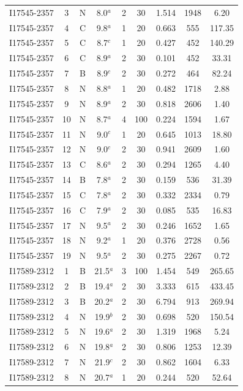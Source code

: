 \begin{table}
\begin{tabular}{ccccccccc}
I17545-2357 & 3 & N & 8.0$^{a}$ & 2 & 30 & 1.514 & 1948 & 6.20 \\
I17545-2357 & 4 & C & 9.8$^{a}$ & 1 & 20 & 0.663 & 555 & 117.35 \\
I17545-2357 & 5 & C & 8.7$^{c}$ & 1 & 20 & 0.427 & 452 & 140.29 \\
I17545-2357 & 6 & C & 8.9$^{a}$ & 2 & 30 & 0.101 & 452 & 33.31 \\
I17545-2357 & 7 & B & 8.9$^{c}$ & 2 & 30 & 0.272 & 464 & 82.24 \\
I17545-2357 & 8 & N & 8.8$^{a}$ & 1 & 20 & 0.482 & 1718 & 2.88 \\
I17545-2357 & 9 & N & 8.9$^{a}$ & 2 & 30 & 0.818 & 2606 & 1.40 \\
I17545-2357 & 10 & N & 8.7$^{a}$ & 4 & 100 & 0.224 & 1594 & 1.67 \\
I17545-2357 & 11 & N & 9.0$^{c}$ & 1 & 20 & 0.645 & 1013 & 18.80 \\
I17545-2357 & 12 & N & 9.0$^{c}$ & 2 & 30 & 0.941 & 2609 & 1.60 \\
I17545-2357 & 13 & C & 8.6$^{a}$ & 2 & 30 & 0.294 & 1265 & 4.40 \\
I17545-2357 & 14 & B & 7.8$^{a}$ & 2 & 30 & 0.159 & 536 & 31.39 \\
I17545-2357 & 15 & C & 7.8$^{a}$ & 2 & 30 & 0.332 & 2334 & 0.79 \\
I17545-2357 & 16 & C & 7.9$^{a}$ & 2 & 30 & 0.085 & 535 & 16.83 \\
I17545-2357 & 17 & N & 9.5$^{a}$ & 2 & 30 & 0.246 & 1652 & 1.65 \\
I17545-2357 & 18 & N & 9.2$^{a}$ & 1 & 20 & 0.376 & 2728 & 0.56 \\
I17545-2357 & 19 & N & 9.5$^{a}$ & 2 & 30 & 0.275 & 2267 & 0.72 \\
I17589-2312 & 1 & B & 21.5$^{a}$ & 3 & 100 & 1.454 & 549 & 265.65 \\
I17589-2312 & 2 & B & 19.4$^{a}$ & 2 & 30 & 3.333 & 615 & 433.45 \\
I17589-2312 & 3 & B & 20.2$^{a}$ & 2 & 30 & 6.794 & 913 & 269.94 \\
I17589-2312 & 4 & N & 19.9$^{b}$ & 2 & 30 & 0.698 & 520 & 150.54 \\
I17589-2312 & 5 & N & 19.6$^{a}$ & 2 & 30 & 1.319 & 1968 & 5.24 \\
I17589-2312 & 6 & N & 19.8$^{a}$ & 2 & 30 & 0.806 & 1253 & 12.39 \\
I17589-2312 & 7 & N & 21.9$^{c}$ & 2 & 30 & 0.862 & 1604 & 6.33 \\
I17589-2312 & 8 & N & 20.7$^{a}$ & 1 & 20 & 0.244 & 520 & 52.64 \\

\end{tabular}
\end{table}
